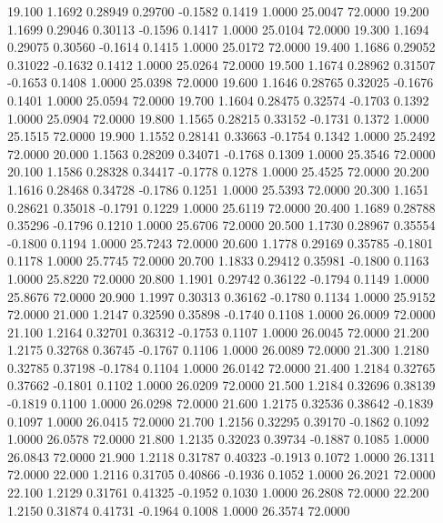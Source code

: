   19.100   1.1692   0.28949   0.29700  -0.1582   0.1419   1.0000  25.0047  72.0000
  19.200   1.1699   0.29046   0.30113  -0.1596   0.1417   1.0000  25.0104  72.0000
  19.300   1.1694   0.29075   0.30560  -0.1614   0.1415   1.0000  25.0172  72.0000
  19.400   1.1686   0.29052   0.31022  -0.1632   0.1412   1.0000  25.0264  72.0000
  19.500   1.1674   0.28962   0.31507  -0.1653   0.1408   1.0000  25.0398  72.0000
  19.600   1.1646   0.28765   0.32025  -0.1676   0.1401   1.0000  25.0594  72.0000
  19.700   1.1604   0.28475   0.32574  -0.1703   0.1392   1.0000  25.0904  72.0000
  19.800   1.1565   0.28215   0.33152  -0.1731   0.1372   1.0000  25.1515  72.0000
  19.900   1.1552   0.28141   0.33663  -0.1754   0.1342   1.0000  25.2492  72.0000
  20.000   1.1563   0.28209   0.34071  -0.1768   0.1309   1.0000  25.3546  72.0000
  20.100   1.1586   0.28328   0.34417  -0.1778   0.1278   1.0000  25.4525  72.0000
  20.200   1.1616   0.28468   0.34728  -0.1786   0.1251   1.0000  25.5393  72.0000
  20.300   1.1651   0.28621   0.35018  -0.1791   0.1229   1.0000  25.6119  72.0000
  20.400   1.1689   0.28788   0.35296  -0.1796   0.1210   1.0000  25.6706  72.0000
  20.500   1.1730   0.28967   0.35554  -0.1800   0.1194   1.0000  25.7243  72.0000
  20.600   1.1778   0.29169   0.35785  -0.1801   0.1178   1.0000  25.7745  72.0000
  20.700   1.1833   0.29412   0.35981  -0.1800   0.1163   1.0000  25.8220  72.0000
  20.800   1.1901   0.29742   0.36122  -0.1794   0.1149   1.0000  25.8676  72.0000
  20.900   1.1997   0.30313   0.36162  -0.1780   0.1134   1.0000  25.9152  72.0000
  21.000   1.2147   0.32590   0.35898  -0.1740   0.1108   1.0000  26.0009  72.0000
  21.100   1.2164   0.32701   0.36312  -0.1753   0.1107   1.0000  26.0045  72.0000
  21.200   1.2175   0.32768   0.36745  -0.1767   0.1106   1.0000  26.0089  72.0000
  21.300   1.2180   0.32785   0.37198  -0.1784   0.1104   1.0000  26.0142  72.0000
  21.400   1.2184   0.32765   0.37662  -0.1801   0.1102   1.0000  26.0209  72.0000
  21.500   1.2184   0.32696   0.38139  -0.1819   0.1100   1.0000  26.0298  72.0000
  21.600   1.2175   0.32536   0.38642  -0.1839   0.1097   1.0000  26.0415  72.0000
  21.700   1.2156   0.32295   0.39170  -0.1862   0.1092   1.0000  26.0578  72.0000
  21.800   1.2135   0.32023   0.39734  -0.1887   0.1085   1.0000  26.0843  72.0000
  21.900   1.2118   0.31787   0.40323  -0.1913   0.1072   1.0000  26.1311  72.0000
  22.000   1.2116   0.31705   0.40866  -0.1936   0.1052   1.0000  26.2021  72.0000
  22.100   1.2129   0.31761   0.41325  -0.1952   0.1030   1.0000  26.2808  72.0000
  22.200   1.2150   0.31874   0.41731  -0.1964   0.1008   1.0000  26.3574  72.0000
